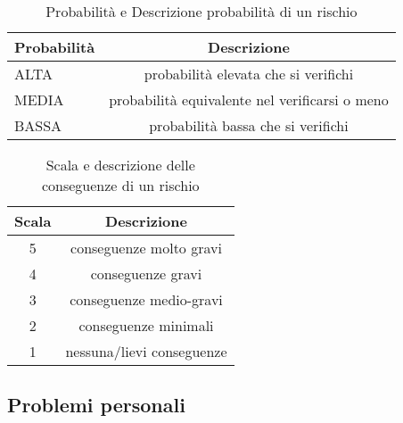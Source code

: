 \begin{table}[h!]
\centering
\begin{tabular}{|l|c|}
\hline
Probabilità& Descrizione\\
\hline
ALTA & probabilità elevata che si verifichi\\
MEDIA & probabilità equivalente nel verificarsi o meno\\
BASSA & probabilità bassa che si verifichi\\
\hline
\end{tabular}
\caption{Probabilità e Descrizione probabilità di un rischio}\label{tab:livellorischi}
\end{table}
\begin{table}[h!]
\centering
\begin{tabular}{|c|c|}
\hline
Scala& Descrizione  \\
\hline
5 & conseguenze molto gravi\\
4 & conseguenze gravi\\
3 & conseguenze medio-gravi\\
2 & conseguenze minimali\\
1 & nessuna/lievi conseguenze\\
\hline
\end{tabular}
\caption{Scala e descrizione delle conseguenze di un rischio}\label{tab:impattorischi}
\end{table}

\subsection{Problemi personali}

